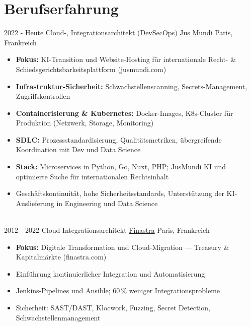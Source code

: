 \documentclass[letterpaper]{twentysecondcv} %
\begin{document}
\makeprofile %


\section{Berufserfahrung}

\begin{twentytimeline}
	\twentyitemtimeline{\faCloud}
		{2022 -}
		{Heute}
		{Cloud-, Integrationsarchitekt (DevSecOps)}
		{\href{https://www.jusmundi.com}{Jus Mundi}}
		{Paris, Frankreich}
		{\begin{itemize}
		\item \textbf{Fokus:} KI-Transition und Website-Hosting für internationale Recht- \& Schiedsgerichtsbarkeitsplattform (jusmundi.com)
		\item \textbf{Infrastruktur-Sicherheit:} Schwachstellenscanning, Secrets-Management, Zugriffskontrollen
		\item \textbf{Containerisierung \& Kubernetes:} Docker-Images, K8s-Cluster für Produktion (Netzwerk, Storage, Monitoring)
		\item \textbf{SDLC:} Prozessstandardisierung, Qualitätsmetriken, übergreifende Koordination mit Dev und Data Science
		\item \textbf{Stack:} Microservices in Python, Go, Nuxt, PHP; JusMundi KI und optimierte Suche für internationalen Rechtsinhalt
		\item Geschäftskontinuität, hohe Sicherheitsstandards, Unterstützung der KI-Auslieferung in Engineering und Data Science
		\end{itemize}}
	\\
	\twentyitemtimeline{\faUsers}
		{2012 -}
		{2022}
		{Cloud-Integrationsarchitekt}
		{\href{https://finastra.com}{Finastra}}
		{Paris, Frankreich}
		{\begin{itemize}
		\item \textbf{Fokus:} Digitale Transformation und Cloud-Migration — Treasury \& Kapitalmärkte (finastra.com)
		\item Einführung kontinuierlicher Integration und Automatisierung
		\item Jenkins-Pipelines und Ansible; 60\,\% weniger Integrationsprobleme
		\item Sicherheit: SAST/DAST, Klocwork, Fuzzing, Secret Detection, Schwachstellenmanagement

\end{itemize}}
\end{twentytimeline}
\end{document}
